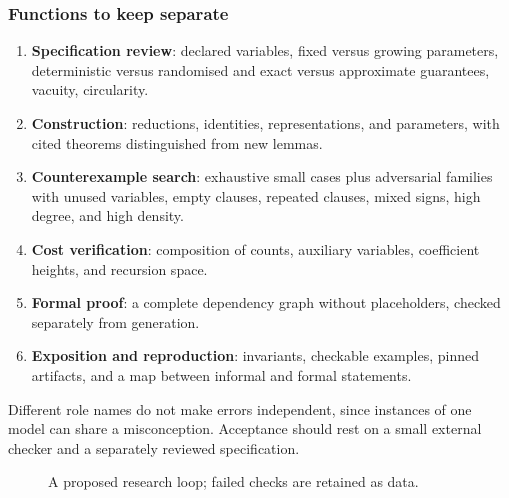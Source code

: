 \documentclass[11pt,reqno]{amsart}
\numberwithin{equation}{section}
\theoremstyle{plain}
\theoremstyle{definition}
\theoremstyle{remark}
\begin{document}
\subsubsection{Functions to keep separate}
\begin{enumerate}[label=(\roman*)]
\item \textbf{Specification review}: declared variables, fixed versus growing
 parameters, deterministic versus randomised and exact versus approximate
 guarantees, vacuity, circularity.
\item \textbf{Construction}: reductions, identities, representations, and
 parameters, with cited theorems distinguished from new lemmas.
\item \textbf{Counterexample search}: exhaustive small cases plus adversarial
 families with unused variables, empty clauses, repeated clauses, mixed
 signs, high degree, and high density.
\item \textbf{Cost verification}: composition of counts, auxiliary
 variables, coefficient heights, and recursion space.
\item \textbf{Formal proof}: a complete dependency graph without
 placeholders, checked separately from generation.
\item \textbf{Exposition and reproduction}: invariants, checkable examples,
 pinned artifacts, and a map between informal and formal statements.
\end{enumerate}
Different role names do not make errors independent, since instances of one
model can share a misconception. Acceptance should rest on a small external
checker and a separately reviewed specification.

\begin{figure}[htbp]
\centering
{}
\caption{A proposed research loop; failed checks are retained as data.}
\end{figure}
\end{document}
